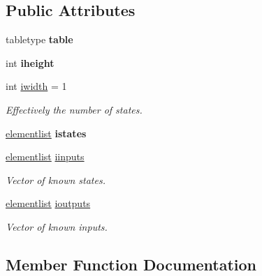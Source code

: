 \subsection*{Public Attributes}
\begin{DoxyCompactItemize}
\item 
\mbox{\label{classsmtable_a9fdbe161f939d8a81cc4929fdc29a5e2}} 
tabletype {\bfseries table}
\item 
\mbox{\label{classsmtable_abde91f025a8892339b963fa34e39ee91}} 
int {\bfseries iheight}
\item 
\mbox{\label{classsmtable_a27d8f277344f3893a635e8286d118896}} 
int \mbox{\hyperlink{classsmtable_a27d8f277344f3893a635e8286d118896}{iwidth}} = 1
\begin{DoxyCompactList}\small\item\em Effectively the number of states. \end{DoxyCompactList}\item 
\mbox{\label{classsmtable_af06793819b0e517623b5e7f4acec88df}} 
\mbox{\hyperlink{classsmtable_a5eb5f5f14b1e52a2bde73255ea71927f}{elementlist}} {\bfseries istates}
\item 
\mbox{\label{classsmtable_a611e95d6d458938df54c3f36138dd075}} 
\mbox{\hyperlink{classsmtable_a5eb5f5f14b1e52a2bde73255ea71927f}{elementlist}} \mbox{\hyperlink{classsmtable_a611e95d6d458938df54c3f36138dd075}{iinputs}}
\begin{DoxyCompactList}\small\item\em Vector of known states. \end{DoxyCompactList}\item 
\mbox{\label{classsmtable_af842bb721a4f45d5a7ee3e79c030a5ca}} 
\mbox{\hyperlink{classsmtable_a5eb5f5f14b1e52a2bde73255ea71927f}{elementlist}} \mbox{\hyperlink{classsmtable_af842bb721a4f45d5a7ee3e79c030a5ca}{ioutputs}}
\begin{DoxyCompactList}\small\item\em Vector of known inputs. \end{DoxyCompactList}\end{DoxyCompactItemize}


\subsection{Member Function Documentation}
\mbox{\label{classsmtable_a9d07557f02b4b69c5f5143fe985e242a}} 
